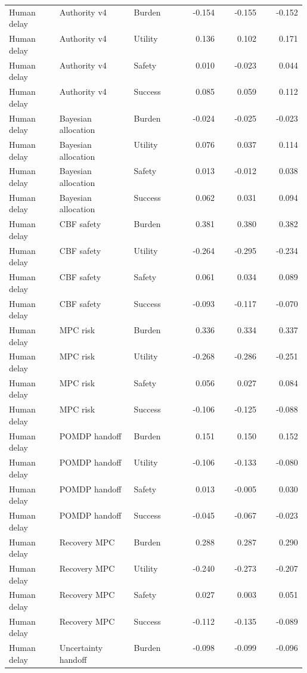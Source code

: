 \documentclass{article}
\begin{document}
\begin{center}
\begin{longtable}{p{0.17\linewidth}p{0.25\linewidth}p{0.16\linewidth}rrr}
Human delay & Authority v4 & Burden & -0.154 & -0.155 & -0.152\\
Human delay & Authority v4 & Utility & 0.136 & 0.102 & 0.171\\
Human delay & Authority v4 & Safety & 0.010 & -0.023 & 0.044\\
Human delay & Authority v4 & Success & 0.085 & 0.059 & 0.112\\
Human delay & Bayesian allocation & Burden & -0.024 & -0.025 & -0.023\\
Human delay & Bayesian allocation & Utility & 0.076 & 0.037 & 0.114\\
Human delay & Bayesian allocation & Safety & 0.013 & -0.012 & 0.038\\
Human delay & Bayesian allocation & Success & 0.062 & 0.031 & 0.094\\
Human delay & CBF safety & Burden & 0.381 & 0.380 & 0.382\\
Human delay & CBF safety & Utility & -0.264 & -0.295 & -0.234\\
Human delay & CBF safety & Safety & 0.061 & 0.034 & 0.089\\
Human delay & CBF safety & Success & -0.093 & -0.117 & -0.070\\
Human delay & MPC risk & Burden & 0.336 & 0.334 & 0.337\\
Human delay & MPC risk & Utility & -0.268 & -0.286 & -0.251\\
Human delay & MPC risk & Safety & 0.056 & 0.027 & 0.084\\
Human delay & MPC risk & Success & -0.106 & -0.125 & -0.088\\
Human delay & POMDP handoff & Burden & 0.151 & 0.150 & 0.152\\
Human delay & POMDP handoff & Utility & -0.106 & -0.133 & -0.080\\
Human delay & POMDP handoff & Safety & 0.013 & -0.005 & 0.030\\
Human delay & POMDP handoff & Success & -0.045 & -0.067 & -0.023\\
Human delay & Recovery MPC & Burden & 0.288 & 0.287 & 0.290\\
Human delay & Recovery MPC & Utility & -0.240 & -0.273 & -0.207\\
Human delay & Recovery MPC & Safety & 0.027 & 0.003 & 0.051\\
Human delay & Recovery MPC & Success & -0.112 & -0.135 & -0.089\\
Human delay & Uncertainty handoff & Burden & -0.098 & -0.099 & -0.096\\

\end{longtable}
\end{center}
\end{document}
